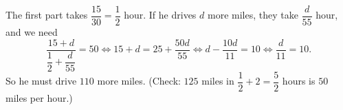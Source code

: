 The first part takes $\dfrac{15}{30}=\dfrac12$ hour. If he drives $d$ more miles, they take $\dfrac{d}{55}$ hour, and we need
\[\dfrac{15+d}{\dfrac12+\dfrac{d}{55}}=50\iff15+d=25+\dfrac{50d}{55}\iff d-\dfrac{10d}{11}=10\iff\dfrac{d}{11}=10.\]
So he must drive $\boxed{110}$ more miles. (Check: $125$ miles in $\dfrac12+2=\dfrac52$ hours is $50$ miles per hour.)
